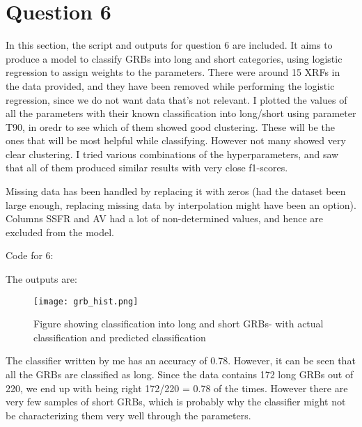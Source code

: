 \section{Question 6}

In this section, the script and outputs for question 6 are included.
It aims to produce a model to classify GRBs into long and short categories, using logistic regression to assign weights to the parameters. There were around 15 XRFs in the data provided, and they have been removed while performing the logistic regression, since we do not want data that's not relevant. 
I plotted the values of all the parameters with their known classification into long/short using parameter T90, in oredr to see which of them showed good clustering. These will be the ones that will be most helpful while classifying. However not many showed very clear clustering. I tried various combinations of the hyperparameters, and saw that all of them produced similar results with very close f1-scores.

Missing data has been handled by replacing it with zeros (had the dataset been large enough, replacing missing data by interpolation might have been an option). Columns SSFR and AV had a lot of non-determined values, and hence are excluded from the model.

Code for 6:


The outputs are:



\begin{figure}[h!]
  \centering
  \texttt{[image: grb\_hist.png]}
  \caption{Figure showing classification into long and short GRBs- with actual classification and predicted classification}
  \label{fig:fig1}
\end{figure}

The classifier written by me has an accuracy of 0.78. However, it can be seen that all the GRBs are classified as long. Since the data contains 172 long GRBs out of 220, we end up with being right 172/220 = 0.78 of the times. However there are very few samples of short GRBs, which is probably why the classifier might not be characterizing them very well through the parameters.  